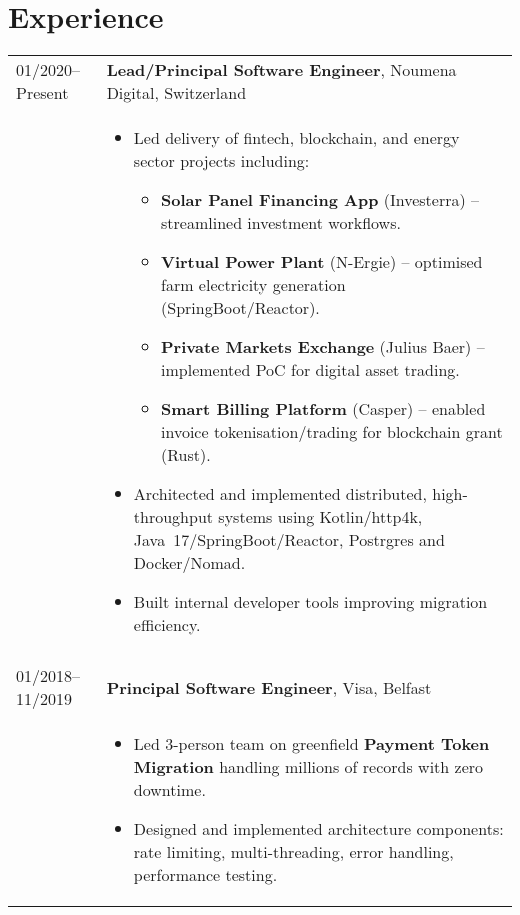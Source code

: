 \documentclass[2pt,a4paper]{article}
\newlength{\datecolumn}
\newlength{\textcolumn}
\begin{document}
\section*{Experience}
\begin{longtable}{p{\datecolumn} p{\textcolumn}}
01/2020--Present & \textbf{Lead/Principal Software Engineer}, Noumena Digital, Switzerland \\
                 & \begin{itemize}
                        \item Led delivery of fintech, blockchain, and energy sector projects including:
                        \begin{itemize}
                            \item \textbf{Solar Panel Financing App} (Investerra) – streamlined investment workflows.
                            \item \textbf{Virtual Power Plant} (N-Ergie) – optimised farm electricity generation (SpringBoot/Reactor).
                            \item \textbf{Private Markets Exchange} (Julius Baer) – implemented PoC for digital asset trading.
                            \item \textbf{Smart Billing Platform} (Casper) – enabled invoice tokenisation/trading for blockchain grant (Rust).
                        \end{itemize} 
                        \item Architected and implemented distributed, high-throughput systems using Kotlin/http4k, Java~17/SpringBoot/Reactor, Postrgres and Docker/Nomad.
                        \item Built internal developer tools improving migration efficiency.
                   \end{itemize} \\ \\
01/2018--11/2019 & \textbf{Principal Software Engineer}, Visa, Belfast \\
                 & \begin{itemize}
                        \item Led 3-person team on greenfield \textbf{Payment Token Migration} handling millions of records with zero downtime.
                        \item Designed and implemented architecture components: rate limiting, multi-threading, error handling, performance testing.

\end{itemize}
\end{longtable}
\end{document}
